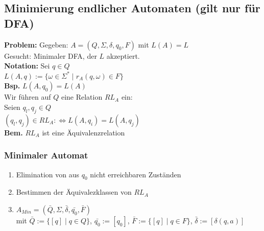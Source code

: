 \documentclass[10pt]{article}
\newcommand{\Bold}[1]{\textbf{#1}} %
\newcommand{\Lra}{\Leftrightarrow}
\begin{document}
\subsection{Minimierung endlicher Automaten (gilt nur f\"ur DFA)}
\Bold{Problem:} Gegeben: $A=(Q,\Sigma,\delta,q_0,F)$ mit $L(A)=L$\\
Gesucht: Minimaler DFA, der $L$ akzeptiert.\\
\Bold{Notation:} Sei $q\in Q$\\
$L(A,q):=\{\omega\in\Sigma^*\mid r_A(q,\omega)\in F\}$\\
\Bold{Bsp.} $L(A,q_0)=L(A)$\\
Wir f\"uhren auf $Q$ eine Relation $RL_A$ ein:\\
Seien $q_l,q_j\in Q$\\
$(q_l,q_j)\in RL_A:\Lra L(A,q_i)=L(A,q_j)$\\
\Bold{Bem.} $RL_A$ ist eine \"Aquivalenzrelation
\subsubsection{Minimaler Automat}
\begin{enumerate}
 \item Elimination von aus $q_0$ nicht erreichbaren Zust\"anden
 \item Bestimmen der \"Aquivalezklassen von $RL_A$
 \item $A_{Min}=(\bar{Q},\Sigma,\bar{\delta},\bar{q_0},\bar{F})$\\
 mit $\bar{Q}:=\{[q]\mid q\in Q\}$, $\bar{q_0}:=[q_0]$, $\bar{F}:=\{[q]\mid q\in F\}$, $\bar{\delta}:=[\delta(q,a)]$
\end{enumerate}
\end{document}
